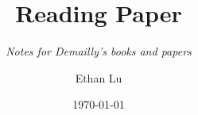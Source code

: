 \documentclass[lang=en,12pt,twoside]{textbook}
\begin{document}
\title{Reading Paper}
\subtitle{\textit{Notes for Demailly's books and papers}}
\author{Ethan Lu}
\date{\today}
\publishers{Textbook}

\begin{titlepage} %
\end{titlepage}
\end{document}
